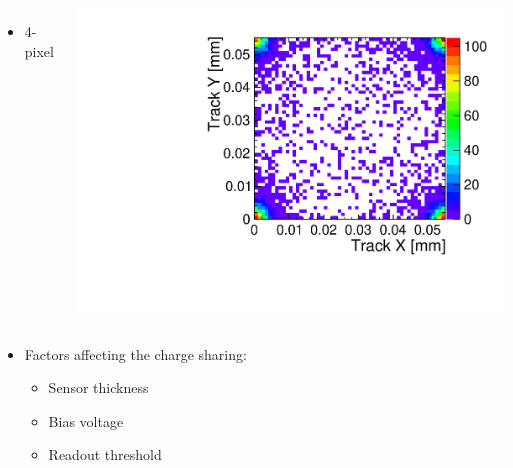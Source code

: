 \begin{frame}
\begin{columns}[t]
    \begin{itemize}
    \item 4-pixel
    \end{itemize}
    \centering
    \includegraphics[width=\textwidth]{../figures/TestBeam/TrackPosWPixel_4hit_runW19_G7.pdf}
  \end{columns}

  \begin{itemize}
  \item Factors affecting the charge sharing:
    \begin{itemize}
    \item Sensor thickness
    \item Bias voltage
    \item Readout threshold 
    \end{itemize}
  \end{itemize}

\end{frame}

